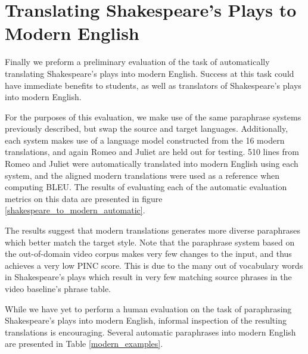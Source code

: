 \documentclass[10pt,a5paper,twoside]{article}
\begin{document}
\section{Translating Shakespeare's Plays to Modern English}
Finally we preform a preliminary evaluation of the task of automatically translating Shakespeare's plays into modern English.  Success at this task could have immediate
benefits to students, as well as translators of Shakespeare's plays into modern English. 

For the purposes of this evaluation, 
we make use of the same paraphrase systems previously described, but swap the source and target languages.
Additionally, each system makes use of a language model constructed from the 16 modern translations, and again Romeo and Juliet are held out for testing.  
510 lines from Romeo and Juliet were automatically translated into modern English using each system, and the aligned modern 
translations were used as a reference when computing BLEU.  The results of evaluating each of the automatic evaluation metrics on this
data are presented in figure \ref{shakespeare_to_modern_automatic}.  

The results suggest that modern translations generates more diverse paraphrases which better match the target style.  Note that the paraphrase system
based on the out-of-domain video corpus makes very few changes to the input, and thus achieves a very low PINC score.  This is due to the many out of
vocabulary words in Shakespeare's plays which result in very few matching source phrases in the video baseline's phrase table.

While we have yet to perform a human evaluation on the task of paraphrasing Shakespeare's plays into modern English, 
informal inspection of the resulting translations is encouraging.  Several automatic paraphrases into modern English are presented in Table \ref{modern_examples}.
\end{document}
